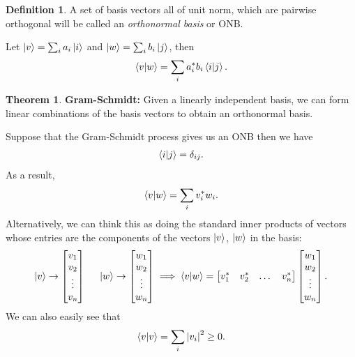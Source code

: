 \documentclass{book}
\theoremstyle{definition}
\newtheorem{defn}{Definition}[section]
\newtheorem{thm}{Theorem}[section]
\newcommand{\w}{\omega}
\begin{document}
\begin{defn}
	A set of basis vectors all of unit norm, which are pairwise orthogonal will be called an \textit{orthonormal basis} or ONB. 
\end{defn}


Let $\ket{v} = \sum_i a_i\ket{i}$ and $\ket{w} = \sum_i b_i \ket{j}$, then 
\begin{align}
\braket{v}{w} = \sum_i a_i^*b_i \braket{i}{j}.
\end{align}



\begin{thm}
	\textbf{Gram-Schmidt:} Given a linearly independent basis, we can form linear combinations of the basis vectors to obtain an orthonormal basis. 
\end{thm}

Suppose that the Gram-Schmidt process gives us an ONB then we have
\begin{align}
\braket{i}{j} = \delta_{ij}.
\end{align}
As a result,
\begin{align}
\braket{v}{w} = \sum_i v_i^*w_i.
\end{align}
Alternatively, we can think this as doing the standard inner products of vectors whose entries are the components of the vectors $\ket{v}$, $\ket{w}$ in the basis:
\begin{align}
\ket{v} \to \begin{bmatrix}
v_1\\v_2\\\vdots\\v_n
\end{bmatrix}\hspace{0.5cm}
\ket{w} \to \begin{bmatrix}
w_1\\w_2\\\vdots\\w_n
\end{bmatrix} \implies \braket{v}{w} = \begin{bmatrix}
v_1^* & v_2^* & \dots & v_n^*
\end{bmatrix}\begin{bmatrix}
w_1\\ w_2 \\\vdots \\ w_n
\end{bmatrix}.
\end{align}
We can also easily see that 
\begin{align}
\braket{v}{v} = \sum_i \abs{v_i}^2 \geq 0.
\end{align}
\end{document}
